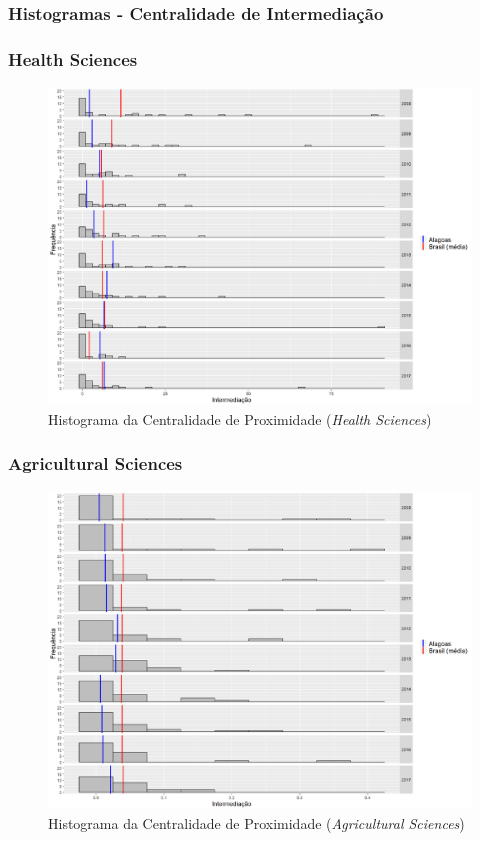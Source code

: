 \subsubsection{Histogramas - Centralidade de Intermediação}

\subsubsection{Health Sciences}

\begin{figure}[H]
	\centering
	\includegraphics[scale=0.6]{Imagens/betweeness-hist.pdf}
	\caption{Histograma da Centralidade de Proximidade (\textit{Health Sciences})}
\end{figure}

\subsubsection{Agricultural Sciences}

\begin{figure}[H]
	\centering
	\includegraphics[scale=0.6]{Imagens/agricultural/betweeness-hist.pdf}
	\caption{Histograma da Centralidade de Proximidade (\textit{Agricultural Sciences})}
\end{figure}

